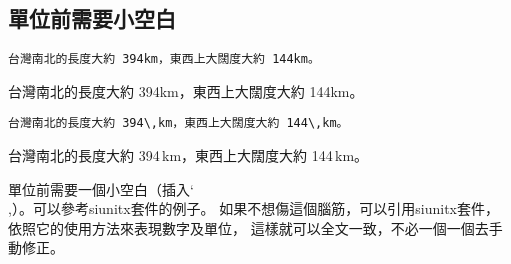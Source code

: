 \subsection{單位前需要小空白}
\label{sub:unit}

\begin{Wrong}
\begin{verbatim}
台灣南北的長度大約 394km，東西上大闊度大約 144km。
\end{verbatim}

台灣南北的長度大約 394km，東西上大闊度大約 144km。
\end{Wrong}

\begin{Right}
\begin{verbatim}
台灣南北的長度大約 394\,km，東西上大闊度大約 144\,km。
\end{verbatim}

台灣南北的長度大約 394\,km，東西上大闊度大約 144\,km。
\end{Right}

單位前需要一個小空白（插入\char`\\,）。可以參考{\sf siunitx}套件的例子。
如果不想傷這個腦筋，可以引用{\sf siunitx}套件，依照它的使用方法來表現數字及單位，
這樣就可以全文一致，不必一個一個去手動修正。

